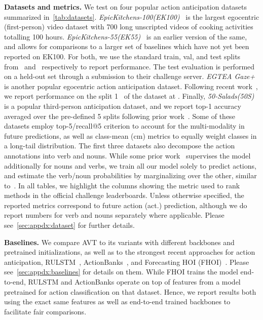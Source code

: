 \documentclass[10pt,twocolumn,letterpaper]{article}
\newcommand{\eknewfull}{EpicKitchens-100\xspace}
\newcommand{\eknew}{EK100\xspace}
\newcommand{\ekfull}{EpicKitchens-55\xspace}
\newcommand{\ek}{EK55\xspace}
\newcommand{\saladfull}{50-Salads\xspace}
\newcommand{\salad}{50S\xspace}
\newcommand{\egtea}{EGTEA Gaze+\xspace}
\newcommand{\rulstm}{RULSTM\xspace}
\newcommand{\fhoi}{FHOI\xspace}
\newcommand{\acbank}{ActionBanks\xspace}
\newcommand{\method}{AVT\xspace}
\begin{document}
{\noindent \bf Datasets and metrics.}
We test on four popular action anticipation datasets summarized in~\cref{tab:datasets}.
{\em \eknewfull (\eknew)}~\cite{damen2020rescaling} is the largest egocentric (first-person) video dataset with 700 long unscripted videos of cooking activities totalling 100 hours. 
{\em \ekfull (\ek)}~\cite{Damen2018EPICKITCHENS} is an earlier version of the same, and allows for comparisons to a larger set of baselines which have not yet been reported on \eknew.
For both, we use the standard train, val, and test splits from~\cite{damen2020rescaling} and~\cite{furnari2019rulstm} respectively to report performance. The test evaluation is performed on a held-out set through a submission to their challenge server.
{\em \egtea}~\cite{li2018eye} is another popular egocentric action anticipation dataset.
Following recent work~\cite{liu2020forecasting}, we report performance on the split 1~\cite{li2018eye} of the dataset at . Finally, {\em \saladfull (\salad)}~\cite{stein2013combining} is a popular third-person anticipation dataset, and we report top-1 accuracy
averaged over the pre-defined 5 splits following prior work~\cite{sener2020temporal}.
Some of these datasets employ top-5/recall@5 criterion to account for the multi-modality in future predictions, as well as class-mean (cm) metrics to equally weight classes in a long-tail distribution.
The first three datasets also decompose the action annotations into verb and nouns.
While some prior work~\cite{sener2020temporal} supervises the model additionally for nouns and verbs,
we train all our model solely to predict actions, and estimate the verb/noun probabilities by marginalizing over the other, similar to~\cite{furnari2019rulstm}.
In all tables, we highlight the columns showing the metric used to rank methods in the official challenge leaderboards. 
Unless otherwise specified, the reported metrics correspond to future action (act.) prediction, although we do report numbers for verb and nouns separately where applicable.
Please see~\cref{sec:appdx:dataset} for further details.




{\noindent \bf Baselines.} 
We compare \method to its variants with different backbones and pretrained initializations, as well as to the strongest recent approaches for action anticipation,
\ie \rulstm~\cite{furnari2019rulstm,furnari2020rulstm}, \acbank~\cite{sener2020temporal}, and Forecasting HOI (\fhoi)~\cite{liu2020forecasting}. 
Please see~\cref{sec:appdx:baselines} for details on them.
While \fhoi trains the model end-to-end, \rulstm and \acbank operate on top of features from a model pretrained for action classification on that dataset. Hence, we
report results both using the exact same features as well as end-to-end trained  backbones  
to facilitate fair comparisons.  
\end{document}
